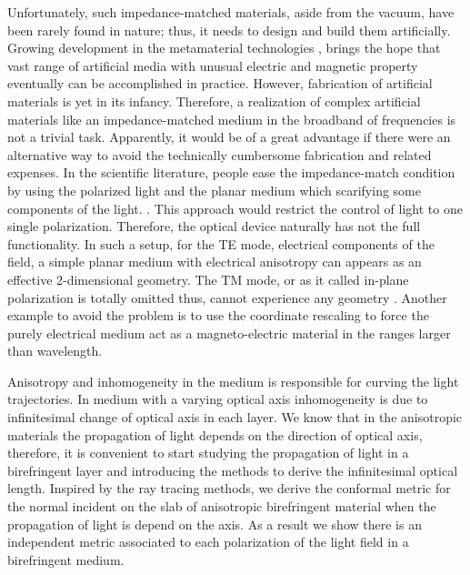 \documentclass[9pt,twocolumn,twoside]{osajnl}
\begin{document}
Unfortunately, such impedance-matched materials, aside from the vacuum, have been rarely found in nature; thus, it needs to design and build them artificially. 
Growing development in the metamaterial technologies \cite{cai2010optical}, brings the hope that vast range of artificial media with unusual electric and magnetic property eventually can be accomplished in practice. 
However, fabrication of artificial materials is yet in its infancy. Therefore, a realization of complex artificial materials like an impedance-matched medium in the broadband of frequencies is not a trivial task. 
Apparently, it would be of a great advantage if there were an alternative way to avoid the technically cumbersome fabrication \cite{narimanov2009optical, lee2014elliptic, dehdashti2013analogue, visser2013survey, robertson2012theory, wang2011cylindrical, bai2010controllable} and related expenses.
In the scientific literature, people ease the impedance-match condition by using the polarized light and the planar medium which scarifying some components of the light. \cite{leonhardt2012geometry}. This approach would restrict the control of light to one single polarization. Therefore, the optical device naturally has not the full functionality. 
 In such a setup, for the TE mode, electrical components of the field, a simple planar medium with electrical anisotropy can appears as an effective 2-dimensional geometry. The TM mode, or as it called in-plane polarization is totally omitted thus, cannot experience any geometry \cite{leonhardt2012geometry, sahar}. 
 Another example to avoid the problem is to use the coordinate rescaling to force the purely electrical medium act as a magneto-electric material in the ranges larger than wavelength\cite{danner2011controlling}. 


Anisotropy and inhomogeneity in the medium is responsible for curving the light trajectories. In medium with a varying optical axis inhomogeneity is due to infinitesimal change of optical axis in each layer. 
We know that in the anisotropic materials the propagation of light depends on the direction of optical axis, therefore, it is convenient to start  studying the propagation of light in a birefringent layer and introducing the methods to derive the infinitesimal optical length.
Inspired by the ray tracing methods, we derive the conformal metric for the normal incident on the slab of anisotropic birefringent material when the propagation of light is depend on the axis.
 As a result we show there is an independent metric associated to each polarization of the light field in a birefringent medium.
\end{document}
